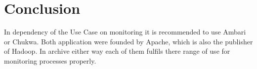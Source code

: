 \documentclass{acm_proc_article-sp}
\begin{document}
\section{Conclusion}
\label{sec:Conclusion}

In dependency of the Use Case on monitoring it is recommended to use Ambari or Chukwa. Both application were founded by Apache, which is also the publisher of Hadoop. In archive either way each of them fulfils there range of use for monitoring processes properly. 




\end{document}
